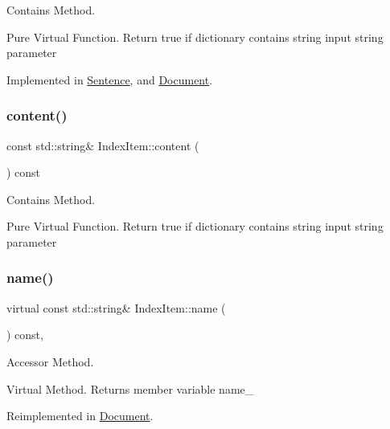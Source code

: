 Contains Method. 

Pure Virtual Function. Return true if dictionary contains string input string parameter 

Implemented in \hyperlink{class_sentence_a867c17dbf3ef55c8708faa120ffad162}{Sentence}, and \hyperlink{class_document_a68e12b27c40699cd3c2fff66a6161473}{Document}.

\mbox{\label{class_index_item_aab7965cbd4a573ebf120ee6bad9a7fbf}} 
\subsubsection{\texorpdfstring{content()}{content()}}
{\footnotesize\ttfamily const std\+::string\& Index\+Item\+::content (\begin{DoxyParamCaption}{ }\end{DoxyParamCaption}) const\hspace{0.3cm}{\ttfamily [inline]}}



Contains Method. 

Pure Virtual Function. Return true if dictionary contains string input string parameter \mbox{\label{class_index_item_a059cbae312c51ae7d02050f8f325bf93}} 
\subsubsection{\texorpdfstring{name()}{name()}}
{\footnotesize\ttfamily virtual const std\+::string\& Index\+Item\+::name (\begin{DoxyParamCaption}{ }\end{DoxyParamCaption}) const\hspace{0.3cm}{\ttfamily [inline]}, {\ttfamily [virtual]}}



Accessor Method. 

Virtual Method. Returns member variable name\+\_\+ 

Reimplemented in \hyperlink{class_document_a68936706468433f1bbba813797e32bd5}{Document}.

\mbox{\label{class_index_item_a38ccc46639b8d0b066024bad728c1bfa}} 

